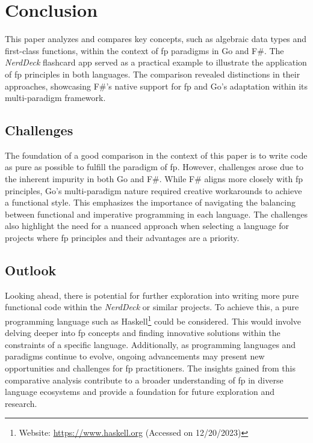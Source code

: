 \chapter{Conclusion}\label{chap:conclusion}
This paper analyzes and compares key concepts, such as algebraic data types and first-class functions, within the context of \ac{fp} paradigms in Go and F\#. The \textit{NerdDeck} flashcard \ac{app} served as a practical example to illustrate the application of \ac{fp} principles in both languages. The comparison revealed distinctions in their approaches, showcasing F\#'s native support for \ac{fp} and Go's adaptation within its multi-paradigm framework.
    \section{Challenges}\label{sec:challenges}
    The foundation of a good comparison in the context of this paper is to write code as pure as possible to fulfill the paradigm of \ac{fp}. However, challenges arose due to the inherent impurity in both Go and F\#. While F\# aligns more closely with \ac{fp} principles, Go's multi-paradigm nature required creative workarounds to achieve a functional style. This emphasizes the importance of navigating the balancing between functional and imperative programming in each language. The challenges also highlight the need for a nuanced approach when selecting a language for projects where \ac{fp} principles and their advantages are a priority.        

    \section{Outlook}\label{sec:outlook}
    Looking ahead, there is potential for further exploration into writing more pure functional code within the \textit{NerdDeck} or similar projects. To achieve this, a pure programming language such as Haskell\footnote{Website: \url{https://www.haskell.org} (Accessed on 12/20/2023)} could be considered. This would involve delving deeper into \ac{fp} concepts and finding innovative solutions within the constraints of a specific language. Additionally, as programming languages and paradigms continue to evolve, ongoing advancements may present new opportunities and challenges for \ac{fp} practitioners. The insights gained from this comparative analysis contribute to a broader understanding of \ac{fp} in diverse language ecosystems and provide a foundation for future exploration and research.
